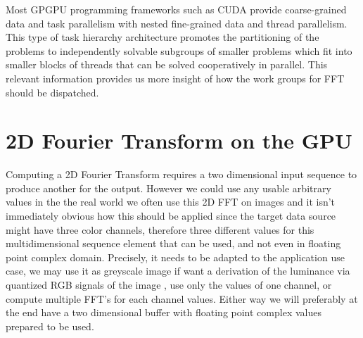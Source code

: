 \documentclass[
  oneside,
  11pt, a4paper,
  footinclude=true,
  headinclude=true,
  cleardoublepage=empty
]{scrbook}
\begin{document}
Most GPGPU programming frameworks such as CUDA provide coarse-grained data and task parallelism with nested fine-grained data and thread parallelism. This type of task hierarchy architecture promotes the partitioning of the problems to independently solvable subgroups of smaller problems which fit into smaller blocks of threads that can be solved cooperatively in parallel. This relevant information provides us more insight of how the work groups for FFT should be dispatched.






\section{2D Fourier Transform on the GPU}


Computing a 2D Fourier Transform requires a two dimensional input sequence to produce another for the output. However we could use any usable arbitrary values in the the real world we often use this 2D FFT on images and it isn't immediately obvious how this should be applied since the target data source might have three color channels, therefore three different values for this multidimensional sequence element that can be used, and not even in floating point complex domain. Precisely, it needs to be adapted to the application use case, we may use it as greyscale image if want a derivation of the luminance via quantized RGB signals of the image \citep{itu2002parameter}, use only the values of one channel, or compute multiple FFT's for each channel values. Either way we will preferably at the end have a two dimensional buffer with floating point complex values prepared to be used.
\newline
\end{document}
